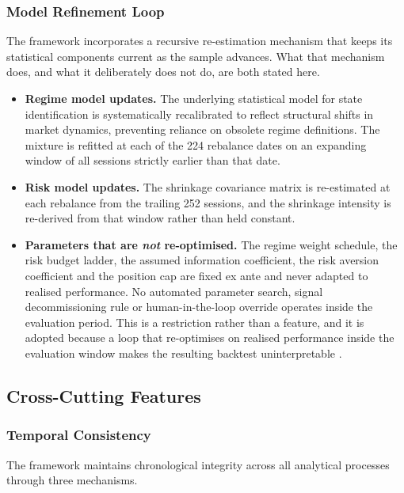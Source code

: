 \documentclass{singlecol-new}
\theoremstyle{TH}{
\newtheorem{lemma}{Lemma}
\newtheorem{theorem}[lemma]{Theorem}
\newtheorem{corrolary}[lemma]{Corrolary}
\newtheorem{conjecture}[lemma]{Conjecture}
\newtheorem{proposition}[lemma]{Proposition}
\newtheorem{claim}[lemma]{Claim}
\newtheorem{stheorem}[lemma]{Wrong Theorem}
\newtheorem{algorithm}{Algorithm}
}
\theoremstyle{THrm}{
\newtheorem{definition}{Definition}[section]
\newtheorem{question}{Question}[section]
\newtheorem{remark}{Remark}
\newtheorem{scheme}{Scheme}
}
\theoremstyle{THhit}{
\newtheorem{case}{Case}[section]
}
\begin{document}
\subsubsection{Model Refinement Loop}

The framework incorporates a recursive re-estimation mechanism that keeps its statistical
components current as the sample advances. What that mechanism does, and what it
deliberately does not do, are both stated here.

\begin{itemize}
\item \textbf{Regime model updates.} The underlying statistical model for state
identification is systematically recalibrated to reflect structural shifts in market
dynamics, preventing reliance on obsolete regime definitions. The mixture is refitted at
each of the 224 rebalance dates on an expanding window of all sessions strictly earlier
than that date.
\item \textbf{Risk model updates.} The shrinkage covariance matrix is re-estimated at
each rebalance from the trailing 252 sessions, and the shrinkage intensity is re-derived
from that window rather than held constant.
\item \textbf{Parameters that are \emph{not} re-optimised.} The regime weight schedule,
the risk budget ladder, the assumed information coefficient, the risk aversion
coefficient and the position cap are fixed ex ante and never adapted to realised
performance. No automated parameter search, signal decommissioning rule or
human-in-the-loop override operates inside the evaluation period. This is a restriction
rather than a feature, and it is adopted because a loop that re-optimises on realised
performance inside the evaluation window makes the resulting backtest uninterpretable
\citep{harvey15}.
\end{itemize}

\subsection{Cross-Cutting Features}

\subsubsection{Temporal Consistency}

The framework maintains chronological integrity across all analytical processes through
three mechanisms.
\end{document}
